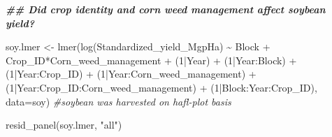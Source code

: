 \documentclass[
]{article}
\newenvironment{Shaded}{\begin{snugshade}}{\end{snugshade}}
\newcommand{\AttributeTok}[1]{\textcolor[rgb]{0.77,0.63,0.00}{#1}}
\newcommand{\CommentTok}[1]{\textcolor[rgb]{0.56,0.35,0.01}{\textit{#1}}}
\newcommand{\DecValTok}[1]{\textcolor[rgb]{0.00,0.00,0.81}{#1}}
\newcommand{\DocumentationTok}[1]{\textcolor[rgb]{0.56,0.35,0.01}{\textbf{\textit{#1}}}}
\newcommand{\FunctionTok}[1]{\textcolor[rgb]{0.00,0.00,0.00}{#1}}
\newcommand{\NormalTok}[1]{#1}
\newcommand{\OtherTok}[1]{\textcolor[rgb]{0.56,0.35,0.01}{#1}}
\newcommand{\SpecialCharTok}[1]{\textcolor[rgb]{0.00,0.00,0.00}{#1}}
\newcommand{\StringTok}[1]{\textcolor[rgb]{0.31,0.60,0.02}{#1}}
\begin{document}
\begin{Shaded}
\begin{Highlighting}[]
\DocumentationTok{\#\# Did crop identity and corn weed management affect soybean yield?}

\NormalTok{soy.lmer }\OtherTok{\textless{}{-}} \FunctionTok{lmer}\NormalTok{(}\FunctionTok{log}\NormalTok{(Standardized\_yield\_MgpHa) }\SpecialCharTok{\textasciitilde{}}\NormalTok{ Block }\SpecialCharTok{+} 
\NormalTok{                   Crop\_ID}\SpecialCharTok{*}\NormalTok{Corn\_weed\_management }\SpecialCharTok{+} 
\NormalTok{                   (}\DecValTok{1}\SpecialCharTok{|}\NormalTok{Year) }\SpecialCharTok{+} 
\NormalTok{                   (}\DecValTok{1}\SpecialCharTok{|}\NormalTok{Year}\SpecialCharTok{:}\NormalTok{Block) }\SpecialCharTok{+} 
\NormalTok{                   (}\DecValTok{1}\SpecialCharTok{|}\NormalTok{Year}\SpecialCharTok{:}\NormalTok{Crop\_ID) }\SpecialCharTok{+} 
\NormalTok{                   (}\DecValTok{1}\SpecialCharTok{|}\NormalTok{Year}\SpecialCharTok{:}\NormalTok{Corn\_weed\_management) }\SpecialCharTok{+}
\NormalTok{                   (}\DecValTok{1}\SpecialCharTok{|}\NormalTok{Year}\SpecialCharTok{:}\NormalTok{Crop\_ID}\SpecialCharTok{:}\NormalTok{Corn\_weed\_management)  }\SpecialCharTok{+} 
\NormalTok{                   (}\DecValTok{1}\SpecialCharTok{|}\NormalTok{Block}\SpecialCharTok{:}\NormalTok{Year}\SpecialCharTok{:}\NormalTok{Crop\_ID),}
  \AttributeTok{data=}\NormalTok{soy) }\CommentTok{\#soybean was harvested on hafl{-}plot basis}

\FunctionTok{resid\_panel}\NormalTok{(soy.lmer, }\StringTok{"all"}\NormalTok{)}
\end{Highlighting}
\end{Shaded}
\end{document}

